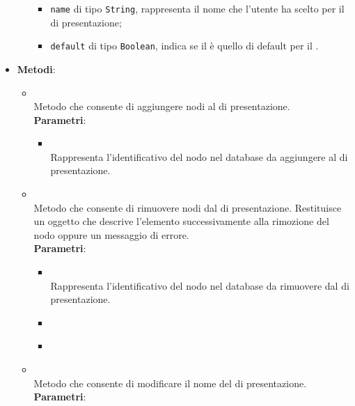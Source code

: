 \begin{itemize}
\begin{itemize}
\begin{itemize}
\item \texttt{name} di tipo \texttt{String}, rappresenta il nome che l’utente ha scelto per il  di presentazione;
\item \texttt{default} di tipo \texttt{Boolean}, indica se il  è quello di default per il .
\end{itemize}
\end{itemize}
\item \textbf{Metodi}:
\begin{itemize}
\item {}
\\ Metodo che consente di aggiungere nodi al  di presentazione.
\\ \textbf{Parametri}:
\begin{itemize}
\item {}
\\ Rappresenta l’identificativo del nodo nel database da aggiungere al  di presentazione.
\end{itemize}
\item {}
\\ Metodo che consente di rimuovere nodi dal  di presentazione. Restituisce un oggetto  che descrive l’elemento successivamente alla rimozione del nodo oppure un messaggio di errore.
\\ \textbf{Parametri}:
\begin{itemize}
\item {}
\\ Rappresenta l’identificativo del nodo nel database da rimuovere dal  di presentazione.
\item {}
\\ \dpCallback
\item {}
\\ \dpErrBack
\end{itemize}
\item {}
\\ Metodo che consente di modificare il nome del  di presentazione.
\\ \textbf{Parametri}:
\begin{itemize}

\end{itemize}
\end{itemize}
\end{itemize}
